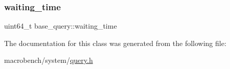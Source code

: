 \subsubsection{\texorpdfstring{waiting\+\_\+time}{waiting\_time}}
{\footnotesize\ttfamily uint64\+\_\+t base\+\_\+query\+::waiting\+\_\+time}



The documentation for this class was generated from the following file\+:\begin{DoxyCompactItemize}
\item 
macrobench/system/\hyperlink{query_8h}{query.\+h}\end{DoxyCompactItemize}
